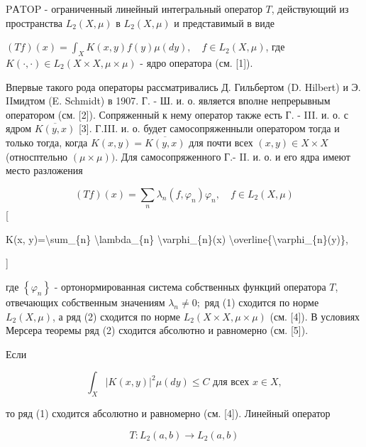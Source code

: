 \documentclass[10pt]{article}
\begin{document}
PАTOP - ограниченный линейный интегральный оператор $T$, действующий из пространства $L_{2}(X, \mu)$ в $L_{2}(X, \mu)$ и представимый в виде



$(T f)(x)=\int_{X} K(x, y) f(y) \mu(d y), \quad f \in L_{2}(X, \mu)$, где $K(\cdot, \cdot) \in L_{2}(X \times X, \mu \times \mu)$ - ядро оператора (см. [1]).



Впервые такого рода операторы рассматривались Д. Гильбертом (D. Hilbert) и Э. IIмидтом (E. Schmidt) в 1907. Г. - Ш. и. о. является вполне непрерывным оператором (см. [2]). Сопряженный к нему оператор также есть Г. - III. и. о. с ядром $\overline{K(y, x)}$ [3]. Г.III. и. о. будет самосопряженныли оператором тогда и только тогда, когда $K(x, y)=\overline{K(y, x)}$ для почти всех $(x, y) \in X \times X \quad$ (относптельно $(\mu \times \mu))$. Для самосопряженного Г.- II. и. о. и его ядра имеют место разложения



\[

(T f)(x)=\sum_{n} \lambda_{n}\left(f, \varphi_{n}\right) \varphi_{n}, \quad f \in L_{2}(X, \mu)

\][



K(x, y)=\textbackslash sum\_\{n\} \textbackslash lambda\_\{n\} \textbackslash varphi\_\{n\}(x) \textbackslash overline\{\textbackslash varphi\_\{n\}(y)\},

]



где $\left\{\varphi_{n}\right\}$ - ортонормированная система собственных функций оператора $T$, отвечающих собственным значениям $\lambda_{n} \neq 0 ;$ ряд (1) сходится по норме $L_{2}(X, \mu)$, а ряд (2) сходится по норме $L_{2}(X \times X, \mu \times \mu)$ (см. [4]). В условиях Мерсера теоремы ряд (2) сходится абсолютно и равномерно (см. [5]).



Если



\[

\int_{X}|K(x, y)|^{2} \mu(d y) \leqslant C \text { для всех } x \in X,

\]



то ряд (1) сходится абсолютно и равномерно (см. [4]). Линейный оператор



\[

T: L_{2}(a, b) \rightarrow L_{2}(a, b)

\]
\end{document}
